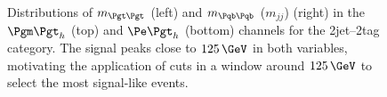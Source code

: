 \begin{figure}
\begin{center}

\end{center}
\caption[Distributions of $m_{\Pgt\Pgt}$ (left) and $m_{jj}$ (right) in the $\mutau$ (top) and
$\etau$ (bottom) channels for the 2jet--2tag category.]{
Distributions of $m_{\Pgt\Pgt}$ (left) and $m_{\Pqb\Pqb}$ ($m_{jj}$) (right) in the $\mutau$ (top) and
$\etau$ (bottom) channels for the 2jet--2tag category. The signal peaks close to
$125\,\GeV$ in both variables, motivating the application of cuts in a window
around $125\,\GeV$ to select the most signal-like events.}
\label{fig:2jet2tagmttmbb}
\end{figure} 

